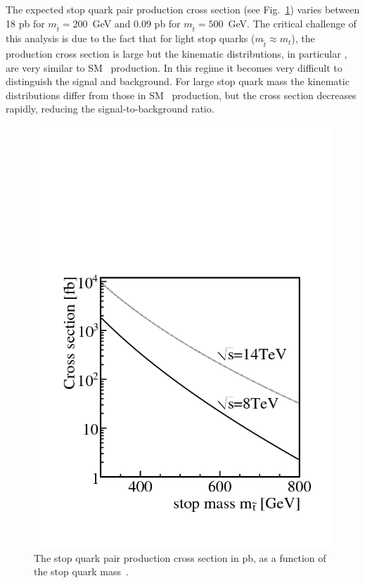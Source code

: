 The expected stop quark pair production cross section (see Fig.~\ref{fig:stopxsec}) varies between 18 pb
for $m_{\tilde{t}}=200$~GeV and 0.09 pb for $m_{\tilde{t}}=500$~GeV\cite{xsec0}.
The critical challenge of this analysis
is due to the fact that for light stop quarks ($m_{\tilde{t}} \approx m_t$), the production cross section is
large but the kinematic distributions, in particular \mt, are very similar to SM \ttbar\ production. In this regime 
it becomes very
difficult to distinguish the signal and background. For large stop quark mass the kinematic distributions differ
from those in SM \ttbar\ production, but the cross section decreases rapidly, reducing the signal-to-background
ratio.

\begin{figure}[hbt]
  \begin{center}
	\includegraphics[width=0.5\linewidth]{plots/stop_cs.png}
	\caption{
	  \label{fig:stopxsec}\protect 
          The stop quark pair production cross section in pb, as a
          function of the stop quark mass~\cite{xsec}.}
  \end{center}
\end{figure}

